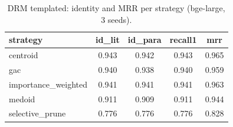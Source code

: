 \begin{table}[t]
\centering
\small
\caption{DRM templated: identity and MRR per strategy (bge-large, 3 seeds).}
\label{tab:drm_breakdown}
\begin{tabular}{lcccc}
\toprule
strategy & id\_lit & id\_para & recall1 & mrr \\
\midrule
centroid & 0.943 & 0.942 & 0.943 & 0.965 \\
gac & 0.940 & 0.938 & 0.940 & 0.959 \\
importance\_weighted & 0.941 & 0.941 & 0.941 & 0.963 \\
medoid & 0.911 & 0.909 & 0.911 & 0.944 \\
selective\_prune & 0.776 & 0.776 & 0.776 & 0.828 \\
\bottomrule
\end{tabular}
\end{table}
